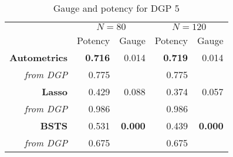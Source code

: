 \begin{table}[htbp]
  \centering

    \begin{tabular}{r|r|r|r|r}

         & \multicolumn{2}{|c|}{\textbf{$N=80$}} & \multicolumn{2}{|c}{\textbf{$N=120$}} \\
            & Potency           & Gauge           & Potency            & Gauge           \\
          \hline
    \textbf{Autometrics} & \textbf{0.716} & 0.014 & \textbf{0.719} & 0.014 \\
    \textit{from DGP} & 0.775 &       & 0.775 &  \\
    \hline
    \textbf{Lasso} & 0.429 & 0.088 & 0.374 & 0.057 \\
    \textit{from DGP} & 0.986 &       & 0.986 &  \\
    \hline
    \textbf{BSTS} & 0.531 & \textbf{0.000}   & 0.439 &\textbf{0.000} \\
    \textit{from DGP} & 0.675 &       & 0.675 &  \\

    \end{tabular}%
      \caption{Gauge and potency for DGP 5}
  \label{DGP5GP}%
\end{table}%






